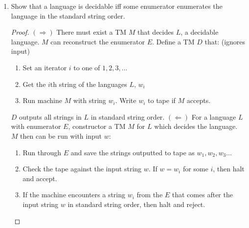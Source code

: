 \documentclass{article}
\begin{document}
\begin{enumerate}
        (construction and proof)
        \begin{proof}
            Let $M_1$ be a Turing machine that recognizes the language $L_1$ and $w$ be a string 
            of the form $L_1^*$. Then have $M_2$ be a machine that splits the input into individual 
            cuts of the input. e.g. $s = s_1s_2s_3...s_n$ for $n$ can be from 0 to the length of 
            $s$. $M_2$ then runs each substring into $M_1$. If it rejects then $M_2$ tries the next
            cuts of the string. If $M_2$ accepts for all cuts of a string, then the language is 
            accepted. As $M_2$ tries every possible split for the input, it will eventually find
            the right match for $L_1$ and therefore recognizes $L_1^*$.
        \end{proof}
        \item Show that a language is decidable iff some enumerator enumerates the language in
        the standard string order.
        \begin{proof}
            $(\Rightarrow)$ There must exist a TM $M$ that decides $L$, a decidable language. $M$
            can reconstruct the enumerator $E$. Define a TM $D$ that: (ignores input)
            \begin{enumerate}
                \item Set an iterator $i$ to one of $1, 2, 3,...$
                \item Get the $i$th string of the languages $L$, $w_i$
                \item Run machine $M$ with string $w_i$. Write $w_i$ to tape if $M$ accepts.
            \end{enumerate}
            $D$ outputs all strings in $L$ in standard string order.\newline
            $(\Leftarrow)$ For a language $L$ with enumerator $E$, constructor a TM $M$ for $L$
            which decides the language. $M$ then can be run with input $w$:
            \begin{enumerate}
                \item Run through $E$ and save the strings outputted to tape as $w_1,w_2,w_3...$
                \item Check the tape against the input string $w$. If $w = w_i$ for some $i$, then
                halt and accept.
                \item If the machine encounters a string $w_i$ from the $E$ that comes after the input
                string $w$ in standard string order, then halt and reject.
            \end{enumerate}
        \end{proof}
    \end{enumerate}
\end{document}
